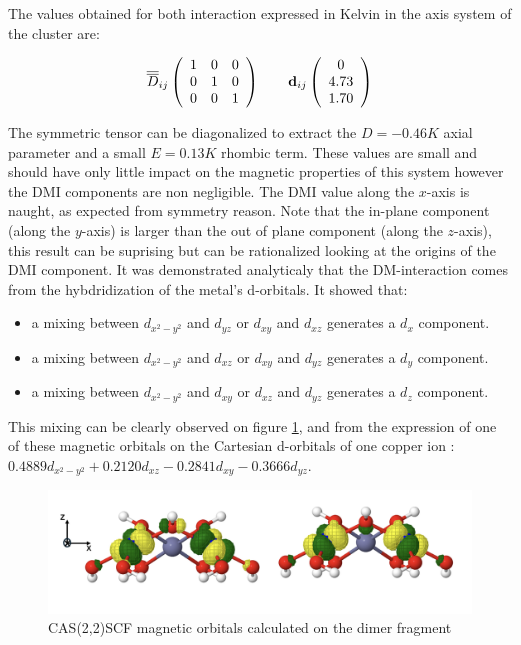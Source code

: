 \documentclass[10pt]{report}
\numberwithin{equation}{section}
\begin{document}
The values obtained for both interaction expressed in Kelvin in the axis system of the cluster are:

\[ \overline{\overline{D}}_{ij} \left( \begin{array}{c c c}
    1 & 0 & 0\\
    0 & 1 & 0\\
    0 & 0 & 1
    \end{array} \right)
    \qquad
    \vb{d}_{ij}
    \left( \begin{array}{c}
    0  \\
    4.73  \\
    1.70
    \end{array} \right)
    \]
    
The symmetric tensor can be diagonalized to extract the $ D = - 0.46 K $ axial parameter and a small $ E = 0.13 K$ rhombic term. These values are small and should have only little impact on the magnetic properties of this system however the DMI components are non negligible. 
The DMI value along the $x$-axis is naught, as expected from symmetry reason. 
Note that the in-plane component (along the $y$-axis) is larger than the out of plane component (along the $z$-axis), this result can be suprising but can be rationalized looking at the origins of the DMI component.
It was demonstrated analyticaly that the DM-interaction comes from the hybdridization of the metal's d-orbitals. 
It showed that:
\begin{itemize}
    \item a mixing between $ d_{x^2-y^2}$ and $ d_{yz}$ or $ d_{xy}$ and $d_{xz}$ generates a $ d_{x}$ component.
    \item a mixing between $d_{x^2-y^2}$ and $ d_{xz}$ or $ d_{xy}$ and $d_{yz}$ generates a $ d_{y}$ component.
    \item a mixing between $ d_{x^2-y^2}$ and $d_{xy}$ or $ d_{xz}$ and $d_{yz}$ generates a $ d_{z}$ component.
\end{itemize}

This mixing can be clearly observed on figure \ref{CAS22}, and from the expression of one of these magnetic orbitals on the Cartesian
d-orbitals of one copper ion : $0.4889d_{x^2-y^2}+0.2120d_{xz}-0.2841d_{xy}-0.3666d_{yz}$.

\begin{figure}[h!]
    \centering
    \includegraphics[width=\textwidth]{Images/CAS22.png}
    \caption{CAS(2,2)SCF magnetic orbitals calculated on the dimer fragment}
    \label{CAS22}
\end{figure}
\end{document}
